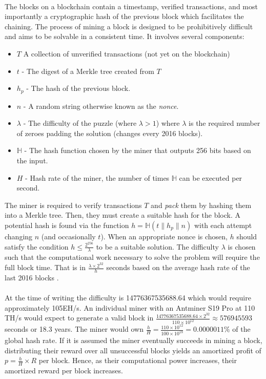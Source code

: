 \paragraph{} The blocks on a blockchain contain a timestamp, verified transactions, and most importantly a cryptographic hash of the previous block which facilitates the chaining. The process of mining a block is designed to be prohibitively difficult and aims to be solvable in a consistent time. It involves several components:

\begin{itemize}
  \item $T$ A collection of unverified transactions (not yet on the blockchain)
  \item $t$ - The digest of a Merkle tree created from $T$
  \item $h_p$ - The hash of the previous block.
  \item $n$ - A random string otherwise known as the \textit{nonce}.
  \item $\lambda$ - The difficulty of the puzzle (where $\lambda > 1$) where $\lambda$ is the required number of zeroes padding the solution (changes every 2016 blocks).
  \item $\mathbb{H}$ - The hash function chosen by the miner that outputs 256 bits based on the input.
  \item $H$ - Hash rate of the miner, the number of times $\mathbb{H}$ can be executed per second.
\end{itemize}

\noindent The miner is required to verify transactions $T$ and \textit{pack} them by hashing them into a Merkle tree. Then, they must create a suitable hash for the block. A potential hash is found via the function $h = \mathbb{H}(t \| h_p \| n)$ with each attempt changing $n$ (and occasionally $t$). When an appropriate nonce is chosen, $h$ should satisfy the condition $h \leq \frac{2^{256}}{\lambda}$ to be a suitable solution. The difficulty $\lambda$ is chosen such that the computational work necessary to solve the problem will require the full block time. That is in $\frac{\lambda \times 2^{32}}{h}$ seconds based on the average hash rate of the last 2016 blocks \cite{difficulty2019}.

\paragraph{} At the time of writing the difficulty is 14776367535688.64 \cite{blockexplorer2020} which would require approximately 105EH/s. An individual miner with an Antminer S19 Pro at 110 TH/s \cite{antminer2018} would expect to generate a valid block in $\frac{14776367535688.64 \times 2^{32}}{110 \times 10^12} \approx 576945593$ seconds or 18.3 years. The miner would own $\frac{h}{H} = \frac{110 \times 10^{12}}{100 \times 10^{18}} = 0.0000011\%$ of the global hash rate. If it is assumed the miner eventually succeeds in mining a block, distributing their reward over all unsuccessful blocks yields an amortized profit of $p = \frac{h}{H} \times R$ per block. Hence, as their computational power increases, their amortized reward per block increases.

